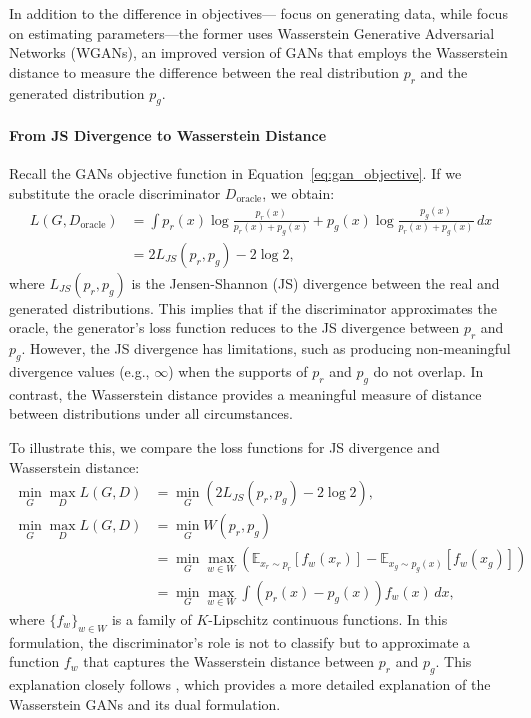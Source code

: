 \documentclass[12pt]{article}
\begin{document}
In addition to the difference in objectives---\citet{athey2024using} focus on
generating data, while \citet{kaji2023adversarial} focus on estimating
parameters---the former uses Wasserstein Generative Adversarial Networks
(WGANs), an improved version of GANs that employs the Wasserstein distance to
measure the difference between the real distribution \(p_r\) and the generated
distribution \(p_g\).

\paragraph{From JS Divergence to Wasserstein Distance}
Recall the GANs objective function in Equation~\ref{eq:gan_objective}. If we
substitute the oracle discriminator \(D_\text{oracle}\), we obtain:
\begin{equation*}
    \begin{split}
        L(G, D_\text{oracle}) & = \int p_r(x) \log \frac{p_r(x)}{p_r(x) + p_g(x)} + p_g(x) \log \frac{p_g(x)}{p_r(x) + p_g(x)} \, dx \\
                              & = 2 L_{JS}(p_r, p_g) - 2 \log 2,
    \end{split}
\end{equation*}
where \(L_{JS}(p_r, p_g)\) is the Jensen-Shannon (JS) divergence between the real and generated distributions. This implies that if the discriminator approximates the oracle, the generator's loss function reduces to the JS divergence between \(p_r\) and \(p_g\). However, the JS divergence has limitations, such as producing non-meaningful divergence values (e.g., \(\infty\)) when the supports of \(p_r\) and \(p_g\) do not overlap. In contrast, the Wasserstein distance provides a meaningful measure of distance between distributions under all circumstances.

To illustrate this, we compare the loss functions for JS divergence and
Wasserstein distance:
\begin{align}
    \min_G \max_D L(G, D) & = \min_G (2 L_{JS}(p_r, p_g) - 2 \log 2), \label{eq:js_loss}                                                                          \\
    \min_G \max_D L(G, D) & = \min_G W(p_r, p_g) \nonumber                                                                                                        \\
                          & = \min_G \max_{w \in W} \left( \mathbb{E}_{x_r \sim p_r}[f_w(x_r)] - \mathbb{E}_{x_g \sim p_g(x)}[f_w(x_g)] \right) \label{eq:w_loss} \\
                          & = \min_G \max_{w \in W} \int \left(p_r(x) - p_g(x)\right) f_w(x) \, dx, \nonumber
\end{align}
where \(\{f_w\}_{w \in W}\) is a family of \(K\)-Lipschitz continuous functions. In this formulation, the discriminator's role is not to classify but to approximate a function \(f_w\) that captures the Wasserstein distance between \(p_r\) and \(p_g\). This explanation closely follows \citet{weng2017gan}, which provides a more detailed explanation of the Wasserstein GANs and its dual formulation.
\end{document}
